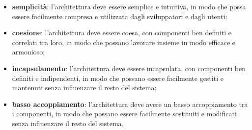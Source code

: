 \begin{itemize}
	\item \textbf{semplicità}: l'architettura deve essere semplice e intuitiva, in modo che possa essere facilmente compresa e utilizzata dagli sviluppatori e dagli utenti;
	\item \textbf{coesione}: l'architettura deve essere coesa, con componenti ben definiti e correlati tra loro, in modo che possano lavorare insieme in modo efficace e armonioso;
	\item \textbf{incapsulamento}: l'architettura deve essere incapsulata, con componenti ben definiti e indipendenti, in modo che possano essere facilmente gestiti e mantenuti senza influenzare il resto del sistema;
	\item \textbf{basso accoppiamento}: l'architettura deve avere un basso accoppiamento tra i componenti, in modo che possano essere facilmente sostituiti e modificati senza influenzare il resto del sistema.
\end{itemize}

